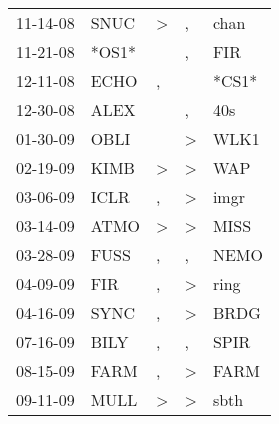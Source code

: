 \begin{supertabular}{p{0.07\textwidth}p{0.06\textwidth}p{0.02\textwidth}p{0.02\textwidth}p{0.06\textwidth}}
          11-14-08\textsuperscript{} &           SNUC\textsuperscript{} &     \textgreater &                , &           chan\textsuperscript{} \\
          11-21-08\textsuperscript{} &                            *OS1* &                  &                , &            FIR\textsuperscript{} \\
          12-11-08\textsuperscript{} &           ECHO\textsuperscript{} &                , &                  &                            *CS1* \\
          12-30-08\textsuperscript{} &           ALEX\textsuperscript{} &                  &                , &            40s\textsuperscript{} \\
          01-30-09\textsuperscript{} &           OBLI\textsuperscript{} &                  &     \textgreater &           WLK1\textsuperscript{} \\
          02-19-09\textsuperscript{} &           KIMB\textsuperscript{} &     \textgreater &     \textgreater &            WAP\textsuperscript{} \\
          03-06-09\textsuperscript{} &           ICLR\textsuperscript{} &                , &     \textgreater &           imgr\textsuperscript{} \\
          03-14-09\textsuperscript{} &           ATMO\textsuperscript{} &     \textgreater &     \textgreater &           MISS\textsuperscript{} \\
          03-28-09\textsuperscript{} &           FUSS\textsuperscript{} &                , &                , &           NEMO\textsuperscript{} \\
          04-09-09\textsuperscript{} &            FIR\textsuperscript{} &                , &     \textgreater &           ring\textsuperscript{} \\
          04-16-09\textsuperscript{} &           SYNC\textsuperscript{} &                , &     \textgreater &           BRDG\textsuperscript{} \\
          07-16-09\textsuperscript{} &           BILY\textsuperscript{} &                , &                , &           SPIR\textsuperscript{} \\
          08-15-09\textsuperscript{} &           FARM\textsuperscript{} &                , &     \textgreater &           FARM\textsuperscript{} \\
          09-11-09\textsuperscript{} &           MULL\textsuperscript{} &     \textgreater &     \textgreater &           sbth\textsuperscript{} \\

\end{supertabular}
